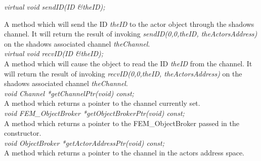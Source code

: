 {\em virtual void sendID(ID \&theID);}

A method which will send the ID {\em theID} to
the actor object through the shadows channel. It will return the
result of invoking {\em sendID(0,0,theID, theActorsAddress)} on the
shadows associated channel {\em theChannel}. \\ 


{\em virtual void recvID(ID \&theID);} \\
A method which will cause the object to read the ID {\em
theID} from the channel. It will return the
result of invoking {\em recvID(0,0,theID, theActorsAddress)} on the
shadows associated channel {\em theChannel}. \\ 


{\em void Channel *getChannelPtr(void) const;}\\
A method which returns a pointer to the channel currently set. \\

{\em void FEM\_ObjectBroker *getObjectBrokerPtr(void) const;}\\
A method which returns a pointer to the FEM\_ObjectBroker passed in the
constructor. \\

{\em void ObjectBroker *getActorAddressPtr(void) const;}\\
A method which returns a pointer to the channel in the actors address
space. \\

